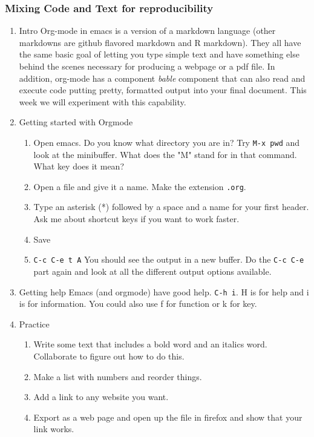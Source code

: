 \documentclass{article}
\begin{document}
\subsubsection{Mixing Code and Text for reproducibility}
\label{sec:orga6ae414}
\begin{enumerate}
\item Intro
\label{sec:org94a4dda}
Org-mode in emacs is a version of a markdown language (other markdowns are github flavored markdown and R markdown). They all have the same basic goal of letting you type simple text and have something else behind the scenes necessary for producing a webpage or a pdf file. In addition, org-mode has a component \emph{bable} component that can also read and execute code putting pretty, formatted output into your final document. This week we will experiment with this capability.
\item Getting started with Orgmode
\label{sec:orge28b065}
\begin{enumerate}
\item Open emacs. Do you know what directory you are in? Try \texttt{M-x pwd} and look at the minibuffer. What does the "M" stand for in that command. What key does it mean?
\item Open a file and give it a name. Make the extension \texttt{.org}.
\item Type an asterisk (*) followed by a space and a name for your first header.
Ask me about shortcut keys if you want to work faster.
\item Save
\item \texttt{C-c C-e t A} You should see the output in a new buffer. Do the \texttt{C-c C-e} part again and look at all the different output options available.
\end{enumerate}
\item Getting help
\label{sec:org660aac8}
Emacs (and orgmode) have good help. \texttt{C-h i}. H is for help and i is for information. You could also use f for function or k for key. 
\item Practice
\label{sec:org95c4d26}
\begin{enumerate}
\item Write some text that includes a bold word and an italics word.
Collaborate to figure out how to do this.
\item Make a list with numbers and reorder things.
\item Add a link to any website you want.
\item Export as a web page and open up the file in firefox and show that your link works.

\end{enumerate}
\end{enumerate}
\end{document}
